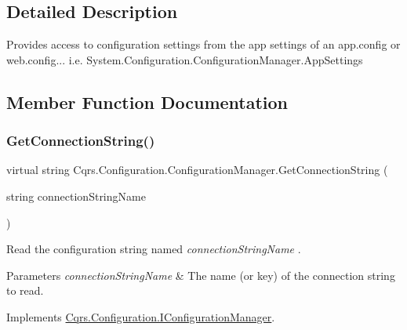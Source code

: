 \subsection{Detailed Description}
Provides access to configuration settings from the app settings of an app.\+config or web.\+config... i.\+e. System.\+Configuration.\+Configuration\+Manager.\+App\+Settings 



\subsection{Member Function Documentation}
\mbox{\label{classCqrs_1_1Configuration_1_1ConfigurationManager_a8be43b873c281c370ecda3f39a235c4b_a8be43b873c281c370ecda3f39a235c4b}} 
\subsubsection{\texorpdfstring{Get\+Connection\+String()}{GetConnectionString()}}
{\footnotesize\ttfamily virtual string Cqrs.\+Configuration.\+Configuration\+Manager.\+Get\+Connection\+String (\begin{DoxyParamCaption}\item[{string}]{connection\+String\+Name }\end{DoxyParamCaption})\hspace{0.3cm}{\ttfamily [virtual]}}



Read the configuration string named {\itshape connection\+String\+Name} . 


\begin{DoxyParams}{Parameters}
{\em connection\+String\+Name} & The name (or key) of the connection string to read.\\
\hline
\end{DoxyParams}


Implements \hyperlink{interfaceCqrs_1_1Configuration_1_1IConfigurationManager_afbfde09d3caec88138c5a08c84539c34_afbfde09d3caec88138c5a08c84539c34}{Cqrs.\+Configuration.\+I\+Configuration\+Manager}.

